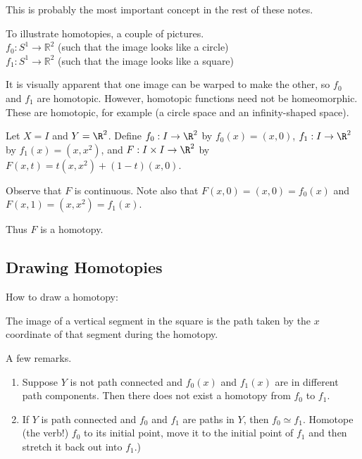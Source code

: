 This is probably the most important concept in the rest of these notes.

To illustrate homotopies, a couple of  pictures.\\
$f_0: S^1 \rightarrow \mathbb{R}^2$ (such that the image looks like a circle)\\
$f_1: S^1 \rightarrow \mathbb{R}^2$ (such that the image looks like a square)\\
\placeholder

It is visually apparent that one image can be warped to make the other, so $f_0$ and $f_1$ are homotopic.
However, homotopic functions need not be homeomorphic.  These  are homotopic, for example (a circle space and an infinity-shaped space).
\placeholder

\begin{example}
Let $X = I$ and $Y = \R^2$. Define
$f_0: I \rightarrow \R^2$ by $f_0(x) = (x,0)$,
$f_1: I \rightarrow \R^2$ by $f_1(x) = (x,x^2)$, and
$F: I \times I \rightarrow \R^2$ by $F(x, t) = t(x, x^2) + (1-t)(x, 0)$.

Observe that $F$ is continuous.  Note also that $F(x,0) = (x, 0) = f_0(x)$ and $F(x,1) = (x, x^2) = f_1(x)$.

Thus $F$ is a homotopy.
\end{example}

\subsection{Drawing Homotopies}

How to draw a homotopy:
\placeholder

The image of a vertical segment in the square is the path taken  by the $x$ coordinate of that segment during the homotopy.


A few remarks.
\begin{enumerate}
\item Suppose $Y$ is not path connected and $f_0(x)$  and $f_1(x)$ are in different path components. Then there does not exist a homotopy from $f_0$ to $f_1$.\\
\placeholder
\item If $Y$ is path connected and $f_0$ and $f_1$ are paths in $Y$, then $f_0 \simeq f_1$. Homotope (the verb!) $f_0$ to its initial point, move it to the initial point of $f_1$ and then stretch it back out into $f_1$.)
\placeholder
\end{enumerate}

